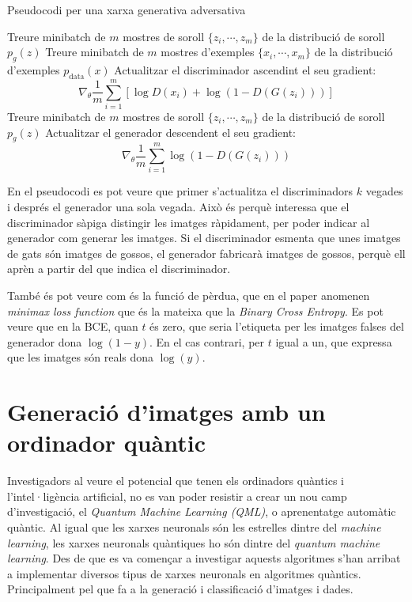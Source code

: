 \begin{algorithm}
	\caption{Pseudocodi per una xarxa generativa adversativa}\label{alg:GAN}
	\begin{algorithmic}
		\State Treure minibatch de $m$ mostres de soroll $\{z_i, \cdots, z_m\}$ de la distribució de soroll $p_g(z)$
		\State Treure minibatch de $m$ mostres d'exemples $\{x_i, \cdots, x_m\}$ de la distribució d'exemples $p_{\mathrm{data}}(x)$
		\State Actualitzar el discriminador ascendint el seu gradient: 
		$$
		\nabla_\theta \frac{1}{m}\sum_{i=1}^{m}\left[\log D(x_i) + \log(1- D(G(z_i)))\right]
		$$
		\EndFor
		\State Treure minibatch de $m$ mostres de soroll $\{z_i, \cdots, z_m\}$ de la distribució de soroll $p_g(z)$
		\State Actualitzar el generador descendent el seu gradient:
		$$
		\nabla_\theta \frac{1}{m} \sum_{i=1}^{m} \log(1-D(G(z_i)))
		$$
		\EndFor
	\end{algorithmic}

\end{algorithm}

En el pseudocodi es pot veure que primer s'actualitza el discriminadors $k$ vegades i després  el generador una sola vegada. Això és perquè interessa que el discriminador sàpiga distingir les imatges ràpidament, per poder indicar al generador com generar les imatges. Si el discriminador esmenta que unes imatges de gats són imatges de gossos, el generador fabricarà imatges de gossos, perquè ell aprèn a partir del que indica el discriminador.

També és pot veure com és la funció de pèrdua, que en el paper anomenen \textit{minimax loss function} que és la mateixa que la \textit{Binary Cross Entropy}. Es pot veure que en la BCE, quan $t$ és zero, que seria l'etiqueta per les imatges falses del generador dona $\log(1-y)$. En el cas contrari, per $t$ igual a un, que expressa que les imatges són reals dona $\log(y)$.  


\chapter{Generació d'imatges amb un ordinador quàntic}

Investigadors al veure el potencial que tenen els ordinadors quàntics i l'intel·ligència artificial, no es van poder resistir a crear un nou camp d'investigació, el \textit{Quantum Machine Learning (QML)}, o aprenentatge automàtic quàntic. Al igual que les xarxes neuronals són les estrelles dintre del \textit{machine learning}, les xarxes neuronals quàntiques ho són dintre del \textit{quantum machine learning}. Des de que es va començar a investigar aquests algoritmes s'han arribat a implementar diversos tipus de xarxes neuronals en algoritmes quàntics. Principalment pel que fa a la generació i classificació d'imatges i dades.

